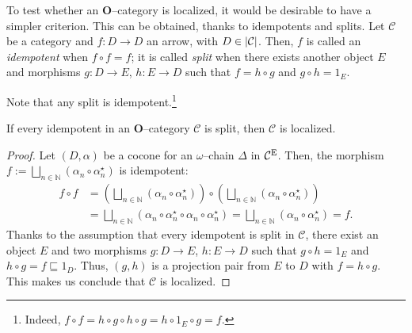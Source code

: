 To test whether an \(\mathbf{O}\)--category is localized, it would be desirable to have a simpler criterion. This can be obtained, thanks to idempotents and splits. Let \(\mathcal{C}\) be a category and \(f \colon D \to D\) an arrow, with \(D \in \lvert \mathcal{C} \rvert\). Then, \(f\) is called an \emph{idempotent} when \(f \circ f = f\); it is called \emph{split} when there exists another object \(E\) and morphisms \(g \colon D \to E\), \(h \colon E \to D\) such that \(f = h \circ g\) and \(g \circ h = 1_E\).
\begin{center}
\end{center}

Note that any split is idempotent.\footnote{Indeed, \(f \circ f = h \circ g \circ h \circ g = h \circ 1_E \circ g = f\).}

\begin{prp}
  If every idempotent in an \(\mathbf{O}\)--category \(\mathcal{C}\) is split, then \(\mathcal{C}\) is localized.
\end{prp}
\begin{proof}
  Let \((D,\alpha)\) be a cocone for an \(\omega{}\)--chain \(\Delta\) in \(\mathcal{C}^\textup{E}\). %
  Then, the morphism \(f := \bigsqcup_{n \in \mathbb{N}}(\alpha_n \circ \alpha_n^\star)\) is idempotent:
  \begin{equation*}
    \begin{split}
      f \circ f &= (\bigsqcup_{n \in \mathbb{N}}(\alpha_n \circ \alpha_n^\star)) \circ (\bigsqcup_{n \in \mathbb{N}}(\alpha_n \circ \alpha_n^\star)) \\
      &= \bigsqcup_{n \in \mathbb{N}}(\alpha_n \circ \alpha_n^\star \circ \alpha_n \circ \alpha_n^\star)
      = \bigsqcup_{n \in \mathbb{N}}(\alpha_n \circ \alpha_n^\star) = f.
    \end{split}
  \end{equation*}
  Thanks to the assumption that every idempotent is split in \(\mathcal{C}\), there exist an object \(E\) and two morphisms \(g \colon D \to E\), \(h \colon E \to D\) such that \(g \circ h = 1_E\) and \(h \circ g = f \sqsubseteq 1_D\).
  Thus, \((g,h)\) is a projection pair from \(E\) to \(D\) with \(f = h \circ g\).
  This makes us conclude that \(\mathcal{C}\) is localized.
\end{proof}

